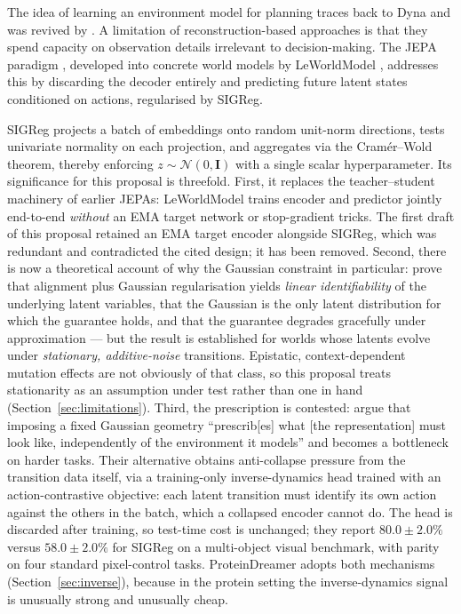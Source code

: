 \documentclass[12pt, a4paper]{article}
\begin{document}
The idea of learning an environment model for planning traces back to Dyna \citep{sutton1991dyna} and was revived by \citet{ha2018worldmodels}. A limitation of reconstruction-based approaches is that they spend capacity on observation details irrelevant to decision-making. The JEPA paradigm \citep{lecun2022path}, developed into concrete world models by LeWorldModel \citep{maes2026leworldmodel}, addresses this by discarding the decoder entirely and predicting future latent states conditioned on actions, regularised by SIGReg.

SIGReg projects a batch of embeddings onto random unit-norm directions, tests univariate normality on each projection, and aggregates via the Cram\'{e}r--Wold theorem, thereby enforcing $z \sim \mathcal{N}(0, \mathbf{I})$ with a single scalar hyperparameter. Its significance for this proposal is threefold. First, it replaces the teacher--student machinery of earlier JEPAs: LeWorldModel trains encoder and predictor jointly end-to-end \textit{without} an EMA target network or stop-gradient tricks. The first draft of this proposal retained an EMA target encoder alongside SIGReg, which was redundant and contradicted the cited design; it has been removed. Second, there is now a theoretical account of why the Gaussian constraint in particular: \citet{klindt2026whenlejepa} prove that alignment plus Gaussian regularisation yields \textit{linear identifiability} of the underlying latent variables, that the Gaussian is the only latent distribution for which the guarantee holds, and that the guarantee degrades gracefully under approximation --- but the result is established for worlds whose latents evolve under \textit{stationary, additive-noise} transitions. Epistatic, context-dependent mutation effects are not obviously of that class, so this proposal treats stationarity as an assumption under test rather than one in hand (Section~\ref{sec:limitations}). Third, the prescription is contested: \citet{boylan2026nogaussian} argue that imposing a fixed Gaussian geometry ``prescrib[es] what [the representation] must look like, independently of the environment it models'' and becomes a bottleneck on harder tasks. Their alternative obtains anti-collapse pressure from the transition data itself, via a training-only inverse-dynamics head trained with an action-contrastive objective: each latent transition must identify its own action against the others in the batch, which a collapsed encoder cannot do. The head is discarded after training, so test-time cost is unchanged; they report $80.0 \pm 2.0\%$ versus $58.0 \pm 2.0\%$ for SIGReg on a multi-object visual benchmark, with parity on four standard pixel-control tasks. ProteinDreamer adopts both mechanisms (Section~\ref{sec:inverse}), because in the protein setting the inverse-dynamics signal is unusually strong and unusually cheap.
\end{document}
